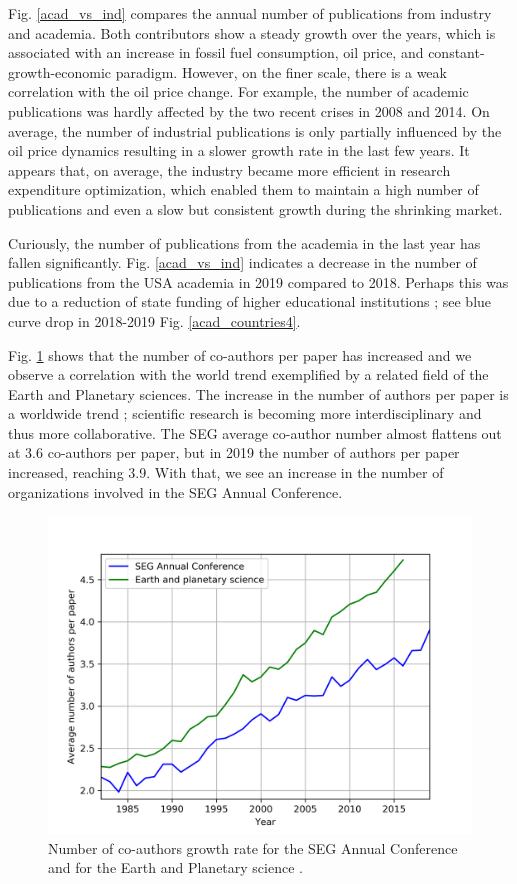 \documentclass[geosciences,article,submit,moreauthors,pdftex]{Definitions/mdpi}
\begin{document}
Fig. \ref{acad_vs_ind} compares the annual number of publications from industry and academia. Both contributors show a steady growth over the years, which is associated with an increase in fossil fuel consumption, oil price, and constant-growth-economic paradigm. However, on the finer scale, there is a weak correlation with the oil price change. For example, the number of academic publications was hardly affected by the two recent crises in 2008 and 2014. On average, the number of industrial publications is only partially influenced by the oil price dynamics resulting in a slower growth rate in the last few years. It appears that, on average, the industry became more efficient in research expenditure optimization, which enabled them to maintain a high number of publications and even a slow but consistent growth during the shrinking market.

Curiously, the number of publications from the academia in the last year has fallen significantly. Fig. \ref{acad_vs_ind} indicates a decrease in the number of publications from the USA academia in 2019 compared to 2018. Perhaps this was due to a reduction of state funding of higher educational institutions \citep{Brownstein2018}; see blue curve drop in 2018-2019 Fig. \ref{acad_countries4}.


Fig. \ref{co_auth} shows that the number of co-authors per paper has increased and we observe a correlation with the world trend exemplified by a related field of the Earth and Planetary sciences. The increase in the number of authors per paper is a worldwide trend \citep{Mallapaty2018}; scientific research is becoming more interdisciplinary and thus more collaborative. The SEG average co-author number almost flattens out at 3.6 co-authors per paper, but in 2019 the number of authors per paper increased, reaching 3.9. With that, we see an increase in the number of organizations involved in the SEG Annual Conference.

\begin{figure}[ht!]
\centering
\includegraphics[scale=0.7]{Co_auth.png}
\caption{Number of co-authors growth rate for the SEG Annual Conference and for the Earth and Planetary science \citep{Mallapaty2018}.}
\label{co_auth}
\end{figure}
\end{document}
